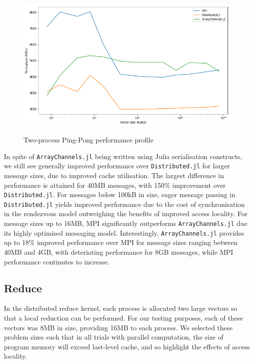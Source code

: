 \begin{figure}[htb]
  \includegraphics[width=\linewidth]{figs/pingpong.png}
  \label{fig:pingpong-results}
  \caption{Two-process Ping-Pong performance profile}
\end{figure}

In spite of \texttt{ArrayChannels.jl} being written using Julia
serialisation constructs, we still see generally improved performance
over \texttt{Distributed.jl} for larger message sizes, due to improved
cache utilisation. The largest difference in performance is attained for
40MB messages, with 150\% improvement over \texttt{Distributed.jl}. For
messages below 100kB in size, eager message passing in
\texttt{Distributed.jl} yields improved performance due to the cost of
synchronisation in the rendezvous model outweighing the benefits of
improved access locality. For message sizes up to 16MB, MPI
significantly outperforms \texttt{ArrayChannels.jl} due its highly
optimised messaging model. Interestingly, \texttt{ArrayChannels.jl}
provides up to 18\% improved performance over MPI for message sizes
ranging between 40MB and 4GB, with deteriating performance for 8GB
messages, while MPI performance continutes to increase.

\subsection{Reduce}
\label{sec:reduce-results}

In the distributed reduce kernel, each process is allocated two large
vectors so that a local reduction can be performed. For our testing
purposes, each of these vectors was 8MB in size, providing 16MB to each
process. We selected these problem sizes such that in all trials with
parallel computation, the size of program memory will exceed last-level
cache, and so highlight the effects of access locality.

